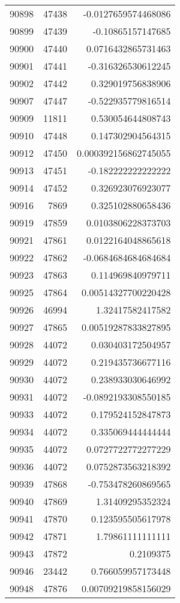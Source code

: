 \begin{tabular}{r | r | r}
90898 & 47438 & -0.0127659574468086 \\
90899 & 47439 & -0.10865157147685 \\
90900 & 47440 & 0.0716432865731463 \\
90901 & 47441 & -0.316326530612245 \\
90902 & 47442 & 0.329019756838906 \\
90907 & 47447 & -0.522935779816514 \\
90909 & 11811 & 0.530054644808743 \\
90910 & 47448 & 0.147302904564315 \\
90912 & 47450 & 0.000392156862745055 \\
90913 & 47451 & -0.182222222222222 \\
90914 & 47452 & 0.326923076923077 \\
90916 & 7869 & 0.325102880658436 \\
90919 & 47859 & 0.0103806228373703 \\
90921 & 47861 & 0.0122164048865618 \\
90922 & 47862 & -0.0684684684684684 \\
90923 & 47863 & 0.114969840979711 \\
90925 & 47864 & 0.00514327700220428 \\
90926 & 46994 & 1.32417582417582 \\
90927 & 47865 & 0.00519287833827895 \\
90928 & 44072 & 0.030403172504957 \\
90929 & 44072 & 0.219435736677116 \\
90930 & 44072 & 0.238933030646992 \\
90931 & 44072 & -0.0892193308550185 \\
90933 & 44072 & 0.179524152847873 \\
90934 & 44072 & 0.335069444444444 \\
90935 & 44072 & 0.0727722772277229 \\
90936 & 44072 & 0.0752873563218392 \\
90939 & 47868 & -0.753478260869565 \\
90940 & 47869 & 1.31409295352324 \\
90941 & 47870 & 0.123595505617978 \\
90942 & 47871 & 1.79861111111111 \\
90943 & 47872 & 0.2109375 \\
90946 & 23442 & 0.766059957173448 \\
90948 & 47876 & 0.00709219858156029 \\

\end{tabular}
